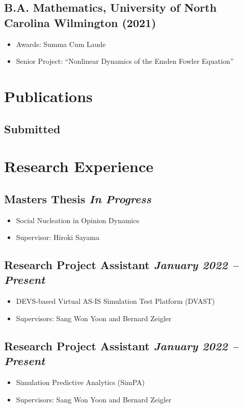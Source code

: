 \documentclass[12pt]{article}
\begin{document}
\subsection{\textbf{B.A. Mathematics}, University of North Carolina Wilmington \hfill (2021)}
\begin{itemize}
    \itemsep = 0em
    \item[] Awards: Summa Cum Laude
    \item[] Senior Project: ``Nonlinear Dynamics of the Emden Fowler Equation''
\end{itemize}

\section{Publications}
\subsection{Submitted}

\section{Research Experience}

\subsection{Masters Thesis \hfill \textit{In Progress}}
\begin{itemize}
    \itemsep = 0em
    \item[] Social Nucleation in Opinion Dynamics
    \item[] Supervisor: Hiroki Sayama
\end{itemize}

\subsection{Research Project Assistant \hfill \textit{January 2022 -- Present}}
\begin{itemize}
    \itemsep = 0em
    \item[] DEVS-based Virtual AS-IS Simulation Test Platform (DVAST)
    \item[] Supervisors: Sang Won Yoon and Bernard Zeigler
\end{itemize}

\subsection{Research Project Assistant \hfill \textit{January 2022 -- Present}}
\begin{itemize}
    \itemsep = 0em
    \item[] Simulation Predictive Analytics (SimPA)
    \item[] Supervisors: Sang Won Yoon and Bernard Zeigler
\end{itemize}
\end{document}
